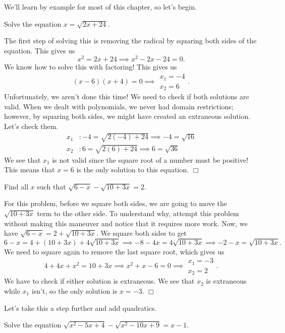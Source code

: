 \documentclass[../book.tex]{subfiles}
\begin{document}
We'll learn by example for most of this chapter, so let's begin.
\begin{example}
Solve the equation $x=\sqrt{2x+24}$.
\end{example}
\begin{solution}
The first step of solving this is removing the radical by squaring both sides of the equation.  This gives us $$x^2=2x+24 \implies x^2-2x-24=0.$$ We know how to solve this with factoring! This gives us $$(x-6)(x+4)=0 \implies \begin{matrix} x_1=-4 \\ x_2=6\end{matrix}.$$ Unfortunately, we aren't done this time! We need to check if both solutions are valid.  When we dealt with polynomials, we never had domain restrictions; however, by squaring both sides, we might have created an extraneous solution.  Let's check them. 
\begin{align*}
    x_1&: -4=\sqrt{2(-4)+24} \implies -4=\sqrt{16} \\
    x_2&: 6=\sqrt{2(6)+24} \implies 6=\sqrt{36}
\end{align*}
We see that $x_1$ is not valid since the square root of a number must be positive!  This means that $x=6$ is the only solution to this equation. $\Box$
\end{solution}
\begin{example}
Find all $x$ such that $\sqrt{6-x}-\sqrt{10+3x}=2.$
\end{example}
\begin{solution}
For this problem, before we square both sides, we are going to move the $\sqrt{10+3x}$ term to the other side.  To understand why, attempt this problem without making this maneuver and notice that it requires more work.  Now, we have $\sqrt{6-x}=2+\sqrt{10+3x}.$ We square both sides to get $$6-x=4+(10+3x)+4\sqrt{10+3x} \implies -8-4x=4\sqrt{10+3x} \implies -2-x=\sqrt{10+3x}.$$ We need to square again to remove the last square root, which gives us $$4+4x+x^2=10+3x \implies x^2+x-6=0 \implies \begin{matrix} x_1=-3 \\ x_2=2 \end{matrix}.$$
We have to check if either solution is extraneous.  We see that $x_2$ is extraneous while $x_1$ isn't, so the only solution is $x=-3$. $\Box$
\end{solution}
Let's take this a step further and add quadratics.
\begin{example}
Solve the equation $\sqrt{x^2-5x+4}-\sqrt{x^2-10x+9}=x-1$.
\end{example}
\end{document}
